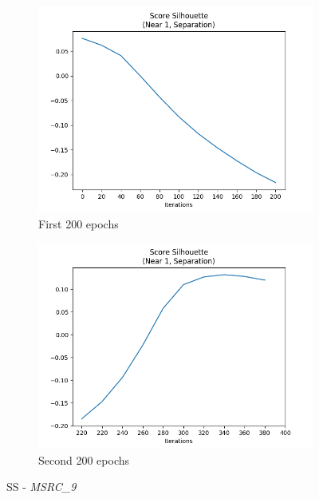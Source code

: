 		\begin{figure}[!ht]
			\centering
			\begin{subfigure}{0.49\textwidth}
				\centering
				\includegraphics[width=1.1\linewidth]{images/plotE6_SS_MSRC_9_E_GDL_22_00h-05mExp3pull}
				\caption{First 200 epochs}
				\label{fig:plote6ssmsrc9egdl2200h-05mexp3pull}
			\end{subfigure}
			\begin{subfigure}{0.49\textwidth}
				\centering
				\includegraphics[width=1.1\linewidth]{images/plotE6_SS_MSRC_9_E_GDL_22_00h-05mExp3pullpush}
				\caption{Second 200 epochs}
				\label{fig:plote6ssmsrc9egdl2200h-05mexp3pullpush}
			\end{subfigure}
			\caption{SS - \textit{MSRC\_9}}
			\label{fig:E6SS}
		\end{figure}
	
